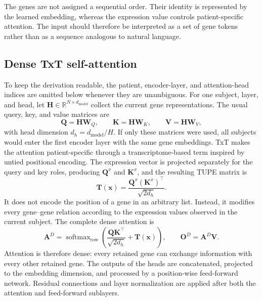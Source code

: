 The genes are not assigned a sequential order. Their identity is represented by the learned embedding, whereas the expression value controls patient-specific attention. The input should therefore be interpreted as a set of gene tokens rather than as a sequence analogous to natural language.

\subsection{Dense TxT self-attention}

To keep the derivation readable, the patient, encoder-layer, and attention-head indices are omitted below whenever they are unambiguous. For one subject, layer, and head, let \(\mathbf{H}\in\mathbb{R}^{N\times d_{\mathrm{model}}}\) collect the current gene representations. The usual query, key, and value matrices are
\begin{equation}
    \mathbf{Q}=\mathbf{H}\mathbf{W}_Q,
    \qquad
    \mathbf{K}=\mathbf{H}\mathbf{W}_K,
    \qquad
    \mathbf{V}=\mathbf{H}\mathbf{W}_V,
\end{equation}
with head dimension \(d_h=d_{\mathrm{model}}/H\). If only these matrices were used, all subjects would enter the first encoder layer with the same gene embeddings. TxT makes the attention patient-specific through a transcriptome-based term inspired by untied positional encoding. The expression vector is projected separately for the query and key roles, producing \(\mathbf{Q}^{x}\) and \(\mathbf{K}^{x}\), and the resulting TUPE matrix is
\begin{equation}
    \mathbf{T}(\mathbf{x})
    =\frac{\mathbf{Q}^{x}(\mathbf{K}^{x})^{\top}}{\sqrt{2d_h}}.
\end{equation}
It does not encode the position of a gene in an arbitrary list. Instead, it modifies every gene--gene relation according to the expression values observed in the current subject. The complete dense attention is
\begin{equation}
\label{eq:txt_dense_logit}
    \mathbf{A}^{D}
    =\operatorname{softmax}_{\mathrm{row}}
    \left(
        \frac{\mathbf{Q}\mathbf{K}^{\top}}{\sqrt{2d_h}}
        +\mathbf{T}(\mathbf{x})
    \right),
    \qquad
    \mathbf{O}^{D}=\mathbf{A}^{D}\mathbf{V}.
\end{equation}
Attention is therefore dense: every retained gene can exchange information with every other retained gene. The outputs of the heads are concatenated, projected to the embedding dimension, and processed by a position-wise feed-forward network. Residual connections and layer normalization are applied after both the attention and feed-forward sublayers.


